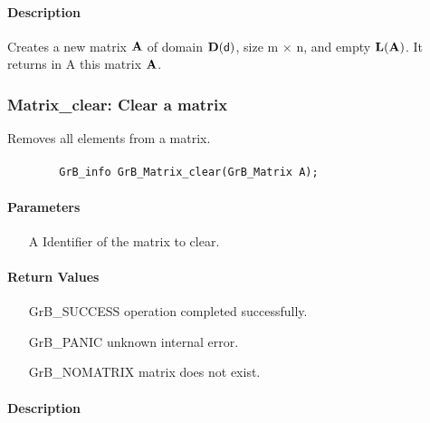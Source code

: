 \paragraph{Description}

Creates a new matrix ${\bf A}$ of domain $\bold{D}({\sf d})$, size {\sf m $\times$ n}, and
empty $\bold{L}({\bf A})$. It returns in {\sf A} this matrix ${\bf A}$.

\subsubsection{{\sf Matrix\_clear}: Clear a matrix}

Removes all elements from a matrix.

\paragraph{\syntax}

\begin{verbatim}
        GrB_info GrB_Matrix_clear(GrB_Matrix A);
\end{verbatim}

\paragraph{Parameters}

\begin{itemize}[leftmargin=1.1in]
    \item[{\sf A}] Identifier of the matrix to clear.
\end{itemize}

\paragraph{Return Values}

\begin{itemize}[leftmargin=2.1in]
\item[{\sf GrB\_SUCCESS}]   operation completed successfully.
\item[{\sf GrB\_PANIC}]     unknown internal error.
\item[{\sf GrB\_NOMATRIX}]  matrix does not exist.
\end{itemize}

\paragraph{Description}

